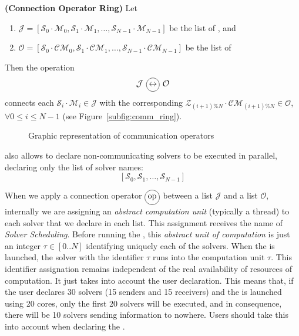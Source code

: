 \begin{definition}\label{op_conn:ring}
{\bf (Connection Operator Ring)} Let 
\begin{enumerate} 
\item $\mathcal{J} = \left[\mathcal{S}_0\cdot \mathcal{M}_0, \mathcal{S}_1\cdot \mathcal{M}_1,\dots, \mathcal{S}_{N-1}\cdot \mathcal{M}_{N-1}\right]$ be the list of \jacks, and 
\item $\mathcal{O} = \left[\mathcal{S}_0\cdot \mathcal{CM}_0, \mathcal{S}_1\cdot \mathcal{CM}_1,\dots, \mathcal{S}_{N-1}\cdot \mathcal{CM}_{N-1}\right]$ be the list of \outlets{} 
\end{enumerate} Then the operation 
\[
\mathcal{J} \poslop{\leftrightarrow} \mathcal{O}
\]
connects each \jack{} $\mathcal{S}_i\cdot \mathcal{M}_i \in \mathcal{J}$ with the corresponding \outlet{} $\mathcal{Z}_{(i+1)\%N}\cdot \mathcal{CM}_{(i+1)\%N} \in \mathcal{O}$, $\forall 0 \leq i \leq N-1$  (see Figure~\ref{subfig:comm_ring}).
\end{definition}

\begin{figure}[h]
\centering
{}
\hspace{0.05\textwidth}%
\hspace{0.05\textwidth}%
\caption[]{Graphic representation of communication operators}
\label{fig:comm}
\end{figure}

\posl{} also allows to declare non-communicating solvers to be executed in parallel, declaring only the list of solver names:
\[
\left[\mathcal{S}_0, \mathcal{S}_1, \dots, \mathcal{S}_{N-1}\right]
\]

When we apply a connection operator $\circled{op}$ between a \jacks{} list $\mathcal{J}$ and a \outlets{} list $\mathcal{O}$, internally we are assigning an \textit{abstract computation unit} (typically a thread) to each solver that we declare in each list. This assignment receives the name of \textit{Solver Scheduling}. Before running the \soset{}, this \textit{abstract unit of computation} is just an integer $\tau \in [0..N]$ identifying uniquely each of the solvers. When the \soset{} is launched, the solver with the identifier $\tau$ runs into the computation unit $\tau$. This identifier assignation remains independent of the real availability of resources of computation. It just takes into account the user declaration. This means that, if the user declares 30 solvers (15 senders and 15 receivers) and the \soset{} is launched using 20 cores, only the first 20 solvers will be executed, and in consequence, there will be 10 solvers sending information to nowhere. Users should take this into account when declaring the \soset.

